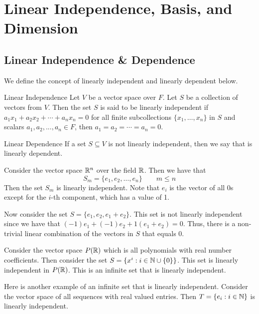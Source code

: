 \documentclass[main.tex]{subfiles}
\begin{document}
    \chapter{Linear Independence, Basis, and Dimension}

    \section{Linear Independence \& Dependence}
    We define the concept of linearly independent and linearly dependent below.

    \begin{defn}{Linear Independence}{}
        Let $V$ be a vector space over $F$. Let $S$ be a collection of vectors from $V$. Then the set $S$ is said to be linearly independent if $a_1x_1 + a_2x_2 + \cdots + a_nx_n = 0$ for all finite subcollections $\{x_1, \dots, x_n\}$ in $S$ and scalars $a_1, a_2, ..., a_n \in F$, then $a_1 = a_2 = \cdots = a_n = 0$. 
    \end{defn}

    \begin{defn}{Linear Dependence}{}
        If a set $S\subseteq V$ is not linearly independent, then we say that is linearly dependent. 
    \end{defn}

    \begin{example}{}{}
        Consider the vector space $\mathbb{R}^n$ over the field $\mathbb{R}$. Then we have that 
        \begin{equation*}
            S_m = \{e_1, e_2, \dots, e_n \} \qquad m \leq n
        \end{equation*}
        Then the set $S_m$ is linearly independent. Note that $e_i$ is the vector of all 0s except for the $i$-th component, which has a value of 1. \bigbreak 

        Now consider the set $S = \{e_1, e_2, e_1 + e_2\}$. This set is not linearly independent since we have that $(-1)e_1 + (-1)e_2 + 1(e_1 + e_2) = 0$. Thus, there is a non-trivial linear combination of the vectors in $S$ that equals 0. 
    \end{example}

    \begin{example}{}{}
        Consider the vector space $P(\mathbb{R})$ which is all polynomials with real number coefficients. Then consider the set $S = \{x^i : i \in \mathbb{N} \cup \{0\}\}$. This set is linearly independent in $P(\mathbb{R})$. This is an infinite set that is linearly independent. \bigbreak 

        Here is another example of an infinite set that is linearly independent. Consider the vector space of all sequences with real valued entries. Then $T = \{e_i : i \in \mathbb{N}\}$ is linearly independent.
    \end{example}
\end{document}
